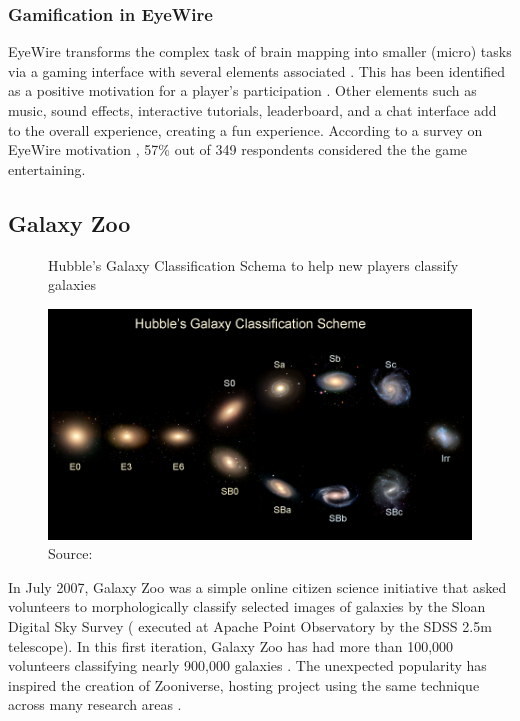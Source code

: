 \subsubsection{Gamification in EyeWire}

EyeWire transforms the complex task of brain mapping into smaller (micro) tasks via a gaming interface with several elements associated \cite{seaborn2015gamification}. This has been identified as a positive motivation for a player's participation \cite{tinati2016because}. Other elements such as music, sound effects, interactive tutorials, leaderboard, and a chat interface add to the overall experience, creating a fun experience. According to a survey on EyeWire motivation \cite{tinati2016because}, 57\% out of 349 respondents considered the the game entertaining.

\subsection{Galaxy Zoo}

\begin{figure}[ht]
    \centering
    \caption{Hubble's Galaxy Classification Schema to help new players classify galaxies}
    \includegraphics[width=0.8\linewidth]{images/background/galaxyzoo-training.jpg}
    \caption*{Source: \cite{galaxyzoo2010hubble}}
    \label{fig:galaxyzoo-hubble}
\end{figure}

In July 2007, Galaxy Zoo was a simple online citizen science initiative that asked volunteers to morphologically classify selected images of galaxies by the Sloan Digital Sky Survey (\cite{york2000sloan} executed at Apache Point Observatory by the SDSS 2.5m telescope). In this first iteration, Galaxy Zoo has had more than 100,000 volunteers classifying nearly 900,000 galaxies \cite{lintott2011galaxy}. The unexpected popularity has inspired the creation of Zooniverse, hosting project using the same technique across many research areas \cite{zooniverse2021galaxy}.

